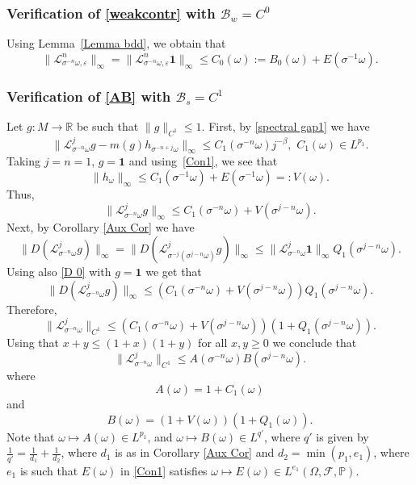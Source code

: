 \documentclass[11pt,reqno,a4paper]{article}
\theoremstyle{special}
\renewcommand{\L}{\mathcal{L}}
\def\B{\mathcal{B}}
\def\om{\omega}
\begin{document}
\subsubsection{Verification of \eqref{weakcontr} with $\B_w=C^0$}
Using Lemma~\ref{Lemma bdd}, we obtain that 
$$
\|\mathcal L_{\sigma^{-n}\omega,\varepsilon}^n\|_\infty= 
\|\mathcal L_{\sigma^{-n}\omega,\varepsilon}^n\textbf{1}\|_\infty\leq C_0(\omega):=B_0(\omega)+E(\sigma^{-1}\omega).
$$

\subsubsection{Verification of \eqref{AB} with $\B_s=C^1$}\label{AB ver sec} 
Let $g:M\to\mathbb R$ be such that $\|g\|_{C^1}\leq 1$.  
First, by \eqref{spectral gap1} we have
$$
\|\L_{\sigma^{-n}\omega}^{j}g-m(g)h_{\sigma^{-n+j}\omega}\|_\infty\leq C_1(\sigma^{-n}\omega)j^{-\beta},\,\, C_1(\omega)\in L^{p_1}.
$$
Taking $j=n=1$, $g=\mathbf 1$ and using~\eqref{Con1}, we see that
\[\|h_\omega\|_\infty\leq C_1(\sigma^{-1}\omega)+E(\sigma^{-1}\omega)=:V(\omega).\] 
Thus,
\begin{equation}\label{D 0}
 \|\L_{\sigma^{-n}\omega}^{j}g\|_\infty\leq C_1(\sigma^{-n}\omega)+V(\sigma^{j-n}\omega).    
\end{equation}
Next, by Corollary \ref{Aux Cor}  we have
$$
\|D(\mathcal L_{\sigma^{-n}\omega}^{j}g)\|_\infty
=\|D(\mathcal L_{\sigma^{-j}(\sigma^{j-n}\omega)}^{j}g)\|_\infty
\leq \|\mathcal L_{\sigma^{-n}\omega}^j\textbf{1}\|_\infty Q_1(\sigma^{j-n}\om).
$$
Using also \eqref{D 0} with $g=\mathbf 1$ we get that 
$$
\|D(\mathcal L_{\sigma^{-n}\omega}^{j}g)\|_\infty\leq \left(C_1(\sigma^{-n}\omega)+V(\sigma^{j-n}\omega)\right)Q_1(\sigma^{j-n}\omega).
$$
Therefore,
$$
\|\L_{\sigma^{-n}\omega}^{j}\|_{C^1}\leq 
\left(C_1(\sigma^{-n}\omega)+V(\sigma^{j-n}\omega)\right)\left(1+Q_1(\sigma^{j-n}\omega)\right).
$$
Using that $x+y\leq (1+x)(1+y)$ for all $x,y\geq 0$ we conclude that
$$
\|\L_{\sigma^{-n}\omega}^{j}\|_{C^1}\leq A(\sigma^{-n}\omega)B(\sigma^{j-n}\omega).
$$
where 
\begin{equation}\label{A def}
A(\omega)=1+C_1(\omega)   \end{equation}
and
\begin{equation}\label{B def}
B(\omega)=(1+V(\omega))(1+Q_1(\omega)).  \end{equation}
Note that $\omega\mapsto A(\omega)\in L^{p_1}$,  and 
$\omega\mapsto B(\omega)\in L^{q'}$, where $q'$ is given by $\frac1{q'}=\frac{1}{d_1}+\frac{1}{d_2}$, where $d_1$ is as in Corollary \ref{Aux Cor} and $d_2=\min(p_1,e_1)$, where $e_1$ is such that $E(\om)$ in \eqref{Con1} satisfies $\om\mapsto E(\om)\in L^{e_1}(\Omega,\mathcal F,\mathbb P)$.
\end{document}
